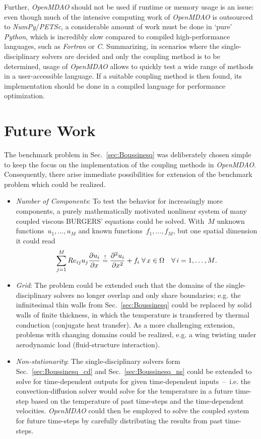 \documentclass[10pt, ngerman, english,
twoside, open=right,
numbers=noenddot,
declaration=section,
abstract=section,
abstract=multiple,
abstract=notoc,
declaration=notoc,
cd=pale, 
chapterprefix=off, 
chapterpage=false, 
headingsvskip=-10em,
cdgeometry=custom, 
slantedgreek=on,
cdmath=on, 
cdfont=on,
ttfont=false,
mathswap=off,
]{tudscrreprt}
\numberwithin{equation}{chapter}
\renewcommand{\textsc}[1]{\uppercase{\mbox{#1}}}
\newcommand{\sidenote}[1]{
  \leavevmode %
  \marginpar{\hyphenpenalty=1000 \flushleft{\textcolor{HKS41}{#1}}}}
\begin{document}
Further, \textit{OpenMDAO} should not be used if runtime or memory usage is an issue: even though much of the intensive computing work of \textit{OpenMDAO} is outsourced to \textit{NumPy}/\textit{PETSc}, a considerable amount of work must be done in `pure' \textit{Python}, which is incredibly slow compared to compiled high-performance languages, such as \textit{Fortran} or \textit{C}.
Summarizing, in scenarios where the single-disciplinary solvers are decided and only the coupling method is to be determined, usage of \textit{OpenMDAO} allows to quickly test a wide range of methods in a user-accessible language. If a suitable coupling method is then found, its implementation should be done in a compiled language for performance optimization.\par
\section{Future Work}\label{sec:End_future}
\sidenote{Benchmarking}The benchmark problem in Sec.~\ref{sec:Boussinesq} was deliberately chosen simple to keep the focus on the implementation of the coupling methods in \textit{OpenMDAO}. Consequently, there arise immediate possibilities for extension of the benchmark problem which could be realized.
\begin{itemize}
\item \textit{Number of Components}: To test the behavior for increasingly more components, a purely mathematically motivated nonlinear system of many coupled viscous \textsc{Burgers}' equations could be solved. With~$M$ unknown functions~$u_1,\ldots,u_M$ and known functions~$f_1,\ldots,f_M$, but one spatial dimension it could read
\[\sum_{j=1}^M Re_{ij} u_j \pdiff{u_i}{x} \overset!= \pdiff[2]{u_i}{x} + f_i\; \forall\, x \in \Omega \quad \forall\,i=1,\ldots,M \text{.}\]
\item \textit{Grid}: The problem could be extended such that the domains of the single-disciplinary solvers no longer overlap and only share boundaries; e.g. the infinitesimal thin walls from Sec.~\ref{sec:Boussinesq} could be replaced by solid walls of finite thickness, in which the temperature is transferred by thermal conduction (conjugate heat transfer). As a more challenging extension, problems with changing domains could be realized, e.g. a wing twisting under aerodynamic load (fluid-structure interaction).
\item \textit{Non-stationarity}: The single-disciplinary solvers form Sec.~\ref{sec:Boussinesq_cd} and Sec.~\ref{sec:Boussinesq_ns} could be extended to solve for time-dependent outputs for given time-dependent inputs~--~i.e. the convection-diffusion solver would solve for the temperature in a future time-step based on the temperature of past time-steps and the time-dependent velocities. \textit{OpenMDAO} could then be employed to solve the coupled system for future time-steps by carefully distributing the results from past time-steps.
\end{itemize}
\end{document}
